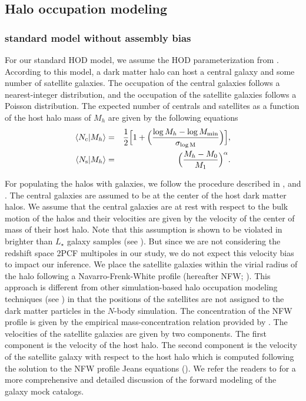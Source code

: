 \documentclass[12pt, preprint]{aastex}
\begin{document}
\subsection{Halo occupation modeling}
\subsubsection{standard model without assembly bias}\label{subsubsec:hod}

For our standard HOD model, we assume the HOD parameterization from \citet{zheng07}. 
According to this model, a dark matter halo can host a central galaxy and some number of satellite galaxies. The occupation of the central galaxies follows a nearest-integer distribution, 
and the occupation of the satellite galaxies follows a Poisson distribution. The expected number of centrals and satellites as a function of the host halo mass of $M_{h}$ are given by the following equations 
\begin{eqnarray}
\langle N_{\rm c}| M_{h} \rangle &=& \frac{1}{2}\Big[1+\Big(\frac{\log M_{h} - \log M_{\rm min}}{\sigma_{\log \rm{M}}} \Big) \Big], \label{hod:central}\\ 
\langle N_{\rm s} | M_{h} \rangle &=& \Big( \frac{M_{h} - M_{\rm{0}}}{M_{\rm 1}} \Big)^{\alpha}. \label{hod:satellite}
\end{eqnarray}

For populating the halos with galaxies, we follow the procedure described in \citet{2016arXiv160701782H}, and \citet{decorated}. The central galaxies are assumed to be at the center of the host dark matter halos. We assume that the central galaxies are at rest with respect to the bulk motion of the halos and their velocities are given by the velocity of the center of mass of their host halo. Note that this assumption is shown to be violated in brighter than $L_{\star}$ galaxy samples (see \citealt{guo2015}). But since we are not considering the redshift space 2PCF multipoles in our study, we do not expect this velocity bias to impact our inference. We place the satellite galaxies within the virial radius of the halo following a Navarro-Frenk-White profile (hereafter NFW; \citealt{nfw}). This approach is different from other simulation-based halo occupation modeling techniques (see \citealt{hod_vs_sham,zheng_guo}) in that the positions of the satellites are not assigned to the dark matter particles in the $N$-body simulation. 
The concentration of the NFW profile is given by the empirical mass-concentration relation provided by \citet{nfw_c(M)}. The velocities of the satellite galaxies are given by two components. The first component is the velocity of the host halo. The second component is the velocity of the satellite galaxy with respect to the host halo which is computed following the solution to the NFW profile Jeans equations (\citealt{more2010}). We refer the readers to \citet{decorated} for a more comprehensive and detailed discussion of the forward modeling of the galaxy mock catalogs.
\end{document}
